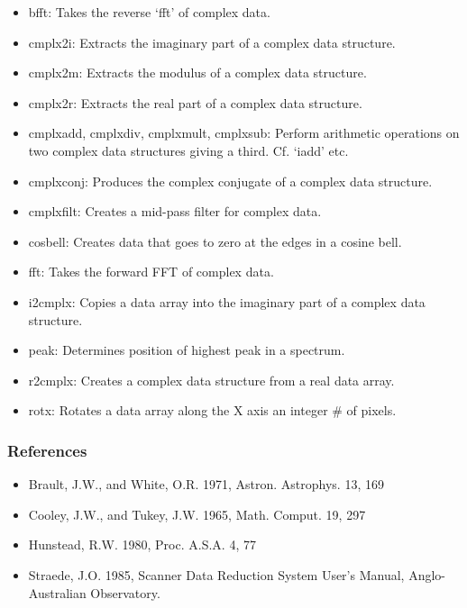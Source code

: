 \documentclass[11pt,twoside]{article}
\begin{document}
\begin{itemize}
\item
   bfft: Takes the reverse `fft' of complex data.
\item
   cmplx2i: Extracts the imaginary part of a complex data structure.
\item
   cmplx2m: Extracts the modulus of a complex data structure.
\item
   cmplx2r: Extracts the real part of a complex data structure.
\item
   cmplxadd, cmplxdiv, cmplxmult, cmplxsub: Perform arithmetic operations
   on two complex data structures giving a third.  Cf. `iadd' etc.
\item
   cmplxconj: Produces the complex conjugate of a
   complex data structure.
\item
   cmplxfilt: Creates a mid-pass filter for complex data.
\item
   cosbell: Creates data that goes to zero at the edges in a
   cosine bell.
\item
   fft: Takes the forward FFT of complex data.
\item
   i2cmplx: Copies a data array into the imaginary part of a complex
   data structure.
\item
   peak: Determines position of highest peak in a spectrum.
\item
   r2cmplx: Creates a complex data structure from a real data array.
\item
   rotx: Rotates a data array along the X axis an integer \# of pixels.
\end{itemize}


\subsubsection{\label{techno6refer}References}

\begin{itemize}
\item
   Brault, J.W., and White, O.R. 1971, Astron. Astrophys. 13, 169
\item
   Cooley, J.W., and Tukey, J.W. 1965, Math. Comput. 19, 297
\item
   Hunstead, R.W. 1980, Proc. A.S.A. 4, 77
\item
   Straede, J.O. 1985, Scanner Data Reduction System User's Manual,
   Anglo-Australian Observatory.
\end{itemize}
\end{document}
